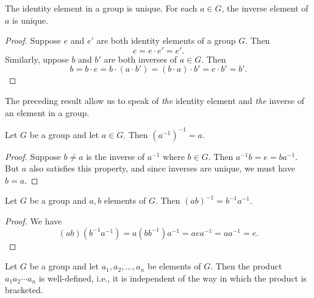 \begin{theorem}
    The identity element in a group is unique. For each \(a \in G\), the inverse
    element of \(a\) is unique.
\end{theorem}

\begin{proof}
    Suppose \(e\) and \(e'\) are both identity elements of a group \(G\). Then
    \[
        e = e \cdot e' = e'.
    \]
    Similarly, uppose \(b\) and \(b'\) are both inverses of \(a \in G\). Then
    \[
        b = b \cdot e = b \cdot (a \cdot b') = (b \cdot a) \cdot b' = e \cdot b' = b'.
    \]
\end{proof}

\begin{remark}
    The preceding result allow us to speak of \emph{the} identity element and
    \emph{the} inverse of an element in a group.
\end{remark}

\begin{theorem}
    Let \(G\) be a group and let \(a \in G\). Then \((a^{-1})^{-1} = a\).
\end{theorem}

\begin{proof}
    Suppose \(b \neq a\) is the inverse of \(a^{-1}\) where \(b \in G\). Then
    \(a^{-1}b = e = ba^{-1}\). But \(a\) also satisfies this property, and since
    inverses are unique, we must have \(b = a\).
\end{proof}

\begin{theorem}
    Let \(G\) be a group and \(a, b\) elements of \(G\). Then \((ab)^{-1} =
    b^{-1}a^{-1}\).
\end{theorem}

\begin{proof}
    We have
    \[
        (ab)(b^{-1}a^{-1}) = a(bb^{-1})a^{-1} = aea^{-1} = aa^{-1} = e.
    \]
\end{proof}

\begin{theorem}
    \label{thm:generalized-associative-law}
    Let \(G\) be a group and let \(a_1, a_2, \ldots, a_n\) be elements of \(G\).
    Then the product \(a_1 a_2 \cdots a_n\) is well-defined, i.e., it is
    independent of the way in which the product is bracketed.
\end{theorem}

